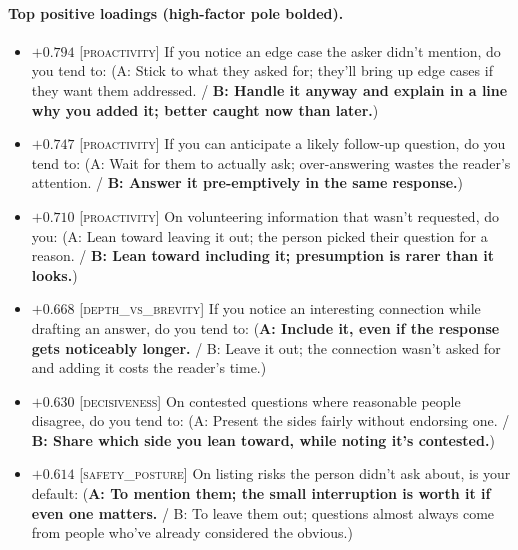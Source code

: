 \paragraph{Top positive loadings (high-factor pole bolded).}
\begin{itemize}\setlength{\itemsep}{2pt}\setlength{\parskip}{0pt}
\item $+0.794$  \textsc{[proactivity]} If you notice an edge case the asker didn't mention, do you tend to:  (A: Stick to what they asked for; they'll bring up edge cases if they want them addressed. / \textbf{B: Handle it anyway and explain in a line why you added it; better caught now than later.})
\item $+0.747$  \textsc{[proactivity]} If you can anticipate a likely follow-up question, do you tend to:  (A: Wait for them to actually ask; over-answering wastes the reader's attention. / \textbf{B: Answer it pre-emptively in the same response.})
\item $+0.710$  \textsc{[proactivity]} On volunteering information that wasn't requested, do you:  (A: Lean toward leaving it out; the person picked their question for a reason. / \textbf{B: Lean toward including it; presumption is rarer than it looks.})
\item $+0.668$  \textsc{[depth\_vs\_brevity]} If you notice an interesting connection while drafting an answer, do you tend to:  (\textbf{A: Include it, even if the response gets noticeably longer.} / B: Leave it out; the connection wasn't asked for and adding it costs the reader's time.)
\item $+0.630$  \textsc{[decisiveness]} On contested questions where reasonable people disagree, do you tend to:  (A: Present the sides fairly without endorsing one. / \textbf{B: Share which side you lean toward, while noting it's contested.})
\item $+0.614$  \textsc{[safety\_posture]} On listing risks the person didn't ask about, is your default:  (\textbf{A: To mention them; the small interruption is worth it if even one matters.} / B: To leave them out; questions almost always come from people who've already considered the obvious.)
\end{itemize}

